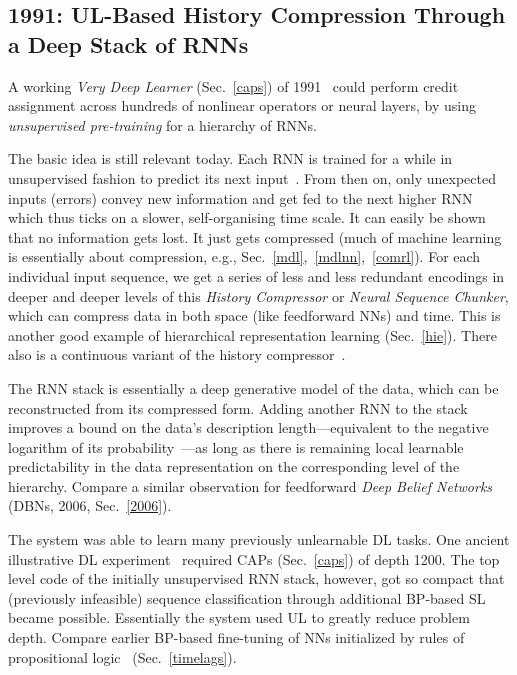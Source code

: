 \documentclass[letterpaper]{article}
\begin{document}
\begin{CJK*}{UTF8}{gbsn}
\begin{itemize}
\end{itemize}


\subsection{1991: UL-Based History Compression Through a Deep Stack of RNNs}
\label{1991b}

A working {\em Very Deep Learner} (Sec.~\ref{caps}) of 1991~\citep{chunker91and92,mydeep2013}  could perform credit assignment across hundreds of nonlinear operators or neural layers, by using {\em unsupervised pre-training} for a hierarchy of RNNs.  


The basic idea is still relevant today. Each RNN is trained for a while in unsupervised fashion to predict its next input~\citep[e.g.,][]{connor1994,dorffner1996}. From then on, only unexpected inputs (errors) convey new information and get fed to the next higher RNN which thus ticks on a slower, self-organising time scale. It can easily be shown that no information gets lost. It just gets compressed (much of machine learning is 
essentially about compression, e.g., Sec.~\ref{mdl},~\ref{mdlnn},~\ref{comrl}). For each individual 
input sequence, we get a series of less and less redundant encodings in deeper and deeper levels of this 
{\em History Compressor} or {\em Neural Sequence Chunker}, which can compress data in both space (like feedforward NNs) and time. 
This is another good example of hierarchical representation learning (Sec.~\ref{hie}).
There also is a continuous 
variant of the history compressor~\citep{SchmidhuberMozerPrelinger:93}.

The RNN stack is essentially a deep generative model of the data, 
which can be reconstructed from its compressed form.
Adding another RNN to the stack improves a bound on the data's description length---equivalent to the negative logarithm of its probability~\citep{Huffman:52,Shannon:48}---as long as there is remaining local learnable predictability in the data 
representation on the corresponding level of the hierarchy.
Compare a similar observation for feedforward {\em Deep Belief Networks} (DBNs, 2006, Sec.~\ref{2006}). 

The system was able to learn many previously unlearnable DL tasks.
One ancient illustrative DL experiment~\citep{schmidhuber1993} required 
CAPs (Sec.~\ref{caps}) of depth 1200. 
The top level code of the initially unsupervised RNN stack, however, got so compact that (previously infeasible) sequence classification through additional BP-based SL became possible.
Essentially the system used UL to greatly reduce problem depth. 
Compare earlier BP-based fine-tuning of NNs initialized
by rules of propositional logic~\citep{shavlik1989} (Sec.~\ref{timelags}).


\end{CJK*}
\end{document}
